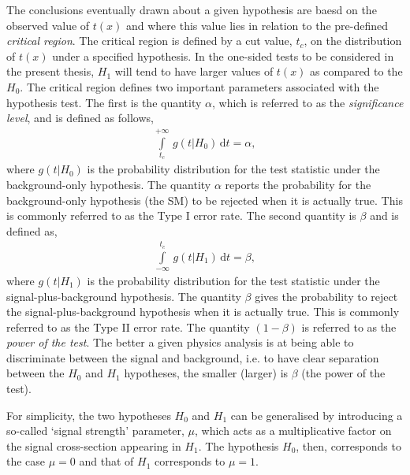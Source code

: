 The conclusions eventually drawn about a given hypothesis are baesd on the observed value
of $t(x)$ and where this value lies in relation to the pre-defined \textit{critical region}.
The critical region is defined by a cut value, $t_c$, on the distribution of $t(x)$ under a specified hypothesis.
In the one-sided tests to be considered in the present thesis, $H_1$
will tend to have larger values of $t(x)$ as compared to the $H_0$.
The critical region defines two important parameters associated with the hypothesis test.
The first is the quantity $\alpha$, which is referred to as the \textit{significance level},
and is defined as follows,
\begin{align}
    \int\limits_{t_c}^{+\infty} \, g(t | H_0) \, \mathrm{d}t = \alpha,
    \label{eq:sig_level}
\end{align}
where $g(t|H_0)$ is the probability distribution for the test statistic under
the background-only hypothesis.
The quantity $\alpha$ reports the probability for the background-only hypothesis (the SM) to be rejected when it is actually
true. This is commonly referred to as the Type I error rate.
The second quantity is $\beta$ and is defined as,
\begin{align}
    \int\limits_{-\infty}^{t_c} \, g(t|H_1) \, \mathrm{d}t = \beta,
    \label{eq:power_level}
\end{align}
where $g(t|H_1)$ is the probability distribution for the test statistic under
the signal-plus-background hypothesis.
The quantity $\beta$ gives the probability to reject the signal-plus-background hypothesis
when it is actually true. This is commonly referred to as the Type II error rate.
The quantity $(1-\beta)$ is referred to as the \textit{power of the test}.
The better a given physics analysis is at being able to discriminate between the signal
and background, i.e. to have clear separation between the $H_0$ and $H_1$ hypotheses,
the smaller (larger) is $\beta$ (the power of the test).

For simplicity, the two hypotheses $H_0$ and $H_1$ can be generalised by introducing a so-called
`signal strength' parameter, $\mu$, which acts as a multiplicative factor on the signal cross-section
appearing in $H_1$.
The hypothesis $H_0$, then, corresponds to the case $\mu = 0$ and that of $H_1$ corresponds to
$\mu = 1$.

